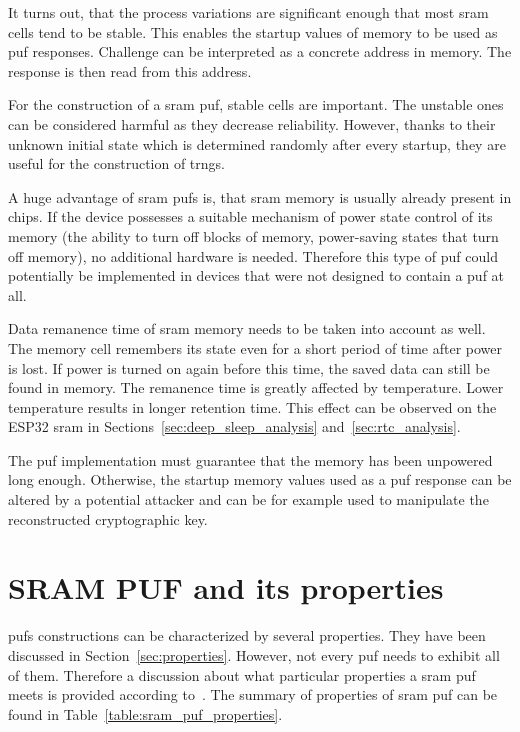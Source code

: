 It turns out, that the process variations are significant enough that most \gls{sram} cells tend to be stable. This enables the startup values of memory to be used as \gls{puf} responses. Challenge can be interpreted as a concrete address in memory. The response is then read from this address.~\cite{Maes2013}

For the construction of a \gls{sram} \gls{puf}, stable cells are important. The unstable ones can be considered harmful as they decrease reliability. However, thanks to their unknown initial state which is determined randomly after every startup, they are useful for the construction of \glspl{trng}.~\cite{Holcomb2009}

A huge advantage of \gls{sram} \glspl{puf} is, that \gls{sram} memory is usually already present in chips. If the device possesses a suitable mechanism of power state control of its memory (the ability to turn off blocks of memory, power-saving states that turn off memory), no additional hardware is needed. Therefore this type of \gls{puf} could potentially be implemented in devices that were not designed to contain a \gls{puf} at all.

Data remanence time of \gls{sram} memory needs to be taken into account as well. The memory cell remembers its state even for a short period of time after power is lost. If power is turned on again before this time, the saved data can still be found in memory. The remanence time is greatly affected by temperature. Lower temperature results in longer retention time. This effect can be observed on the ESP32 \gls{sram} in Sections~\ref{sec:deep_sleep_analysis} and~\ref{sec:rtc_analysis}.

The \gls{puf} implementation must guarantee that the memory has been unpowered long enough. Otherwise, the startup memory values used as a \gls{puf} response can be altered by a potential attacker and can be for example used to manipulate the reconstructed cryptographic key.~\cite{Nikolaos2018}

\section{SRAM PUF and its properties}\label{sec:srampuf_properties}

\glspl{puf} constructions can be characterized by several properties. They have been discussed in Section~\ref{sec:properties}. However, not every \gls{puf} needs to exhibit all of them. Therefore a discussion about what particular properties a \gls{sram} \gls{puf} meets is provided according to~\cite{Maes2013}. The summary of properties of \gls{sram} \gls{puf} can be found in Table~\ref{table:sram_puf_properties}.

